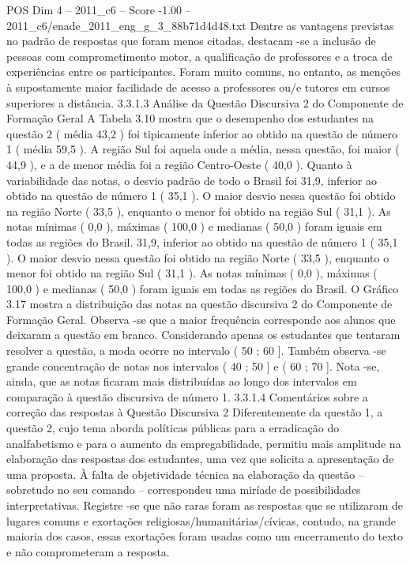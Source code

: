 \begin{textsample}{POS Dim 4 – 2011\_c6 – Score -1.00 – 2011\_c6/enade\_2011\_eng\_g\_3\_88b71d4d48.txt}
Dentre as vantagens previstas no padrão de respostas que foram menos citadas, destacam -se a inclusão de pessoas com comprometimento motor, a qualificação de professores e a troca de experiências entre os participantes.
Foram muito comuns, no entanto, as menções à supostamente maior facilidade de acesso a professores ou/e tutores em cursos superiores a distância. 3.3.1.3 Análise da Questão Discursiva 2 do Componente de Formação Geral A Tabela 3.10 mostra que o desempenho dos estudantes na questão 2 ( média 43,2 ) foi tipicamente inferior ao obtido na questão de número 1 ( média 59,5 ).
A região Sul foi aquela onde a média, nessa questão, foi maior ( 44,9 ), e a de menor média foi a região Centro-Oeste ( 40,0 ).
Quanto à variabilidade das notas, o desvio padrão de todo o Brasil foi 31,9, inferior ao obtido na questão de número 1 ( 35,1 ).
O maior desvio nessa questão foi obtido na região Norte ( 33,5 ), enquanto o menor foi obtido na região Sul ( 31,1 ).
As notas mínimas ( 0,0 ), máximas ( 100,0 ) e medianas ( 50,0 ) foram iguais em todas as regiões do Brasil. 31,9, inferior ao obtido na questão de número 1 ( 35,1 ).
O maior desvio nessa questão foi obtido na região Norte ( 33,5 ), enquanto o menor foi obtido na região Sul ( 31,1 ).
As notas mínimas ( 0,0 ), máximas ( 100,0 ) e medianas ( 50,0 ) foram iguais em todas as regiões do Brasil.
O Gráfico 3.17 mostra a distribuição das notas na questão discursiva 2 do Componente de Formação Geral.
Observa -se que a maior frequência corresponde aos alunos que deixaram a questão em branco.
Considerando apenas os estudantes que tentaram resolver a questão, a moda ocorre no intervalo ( 50 ; 60 ].
Também observa -se grande concentração de notas nos intervalos ( 40 ; 50 ] e ( 60 ; 70 ].
Nota -se, ainda, que as notas ficaram mais distribuídas ao longo dos intervalos em comparação à questão discursiva de número 1. 3.3.1.4 Comentários sobre a correção das respostas à Questão Discursiva 2 Diferentemente da questão 1, a questão 2, cujo tema aborda políticas públicas para a erradicação do analfabetismo e para o aumento da empregabilidade, permitiu mais amplitude na elaboração das respostas dos estudantes, uma vez que solicita a apresentação de uma proposta.
À falta de objetividade técnica na elaboração da questão – sobretudo no seu comando – correspondeu uma miríade de possibilidades interpretativas.
Registre -se que não raras foram as respostas que se utilizaram de lugares comuns e exortações religiosas/humanitárias/cívicas, contudo, na grande maioria dos casos, essas exortações foram usadas como um encerramento do texto e não comprometeram a resposta.

\end{textsample}
